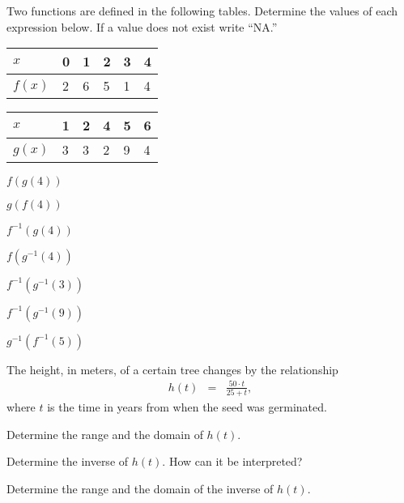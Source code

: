 \begin{problem}
\item Two functions are defined in the following tables. Determine the
  values of each expression below. If a value does not exist write
  ``NA.''

  \begin{tabular}[h]{l||l|l|l|l|l}
    $x$    & 0 & 1 & 2 & 3 & 4 \\ \hline
    $f(x)$ & 2 & 6 & 5 & 1 & 4 \\
  \end{tabular}

  \begin{tabular}[h]{l||l|l|l|l|l}
    $x$    & 1 & 2 & 4 & 5 & 6 \\ \hline
    $g(x)$ & 3 & 3 & 2 & 9 & 4 \\
  \end{tabular}

  \begin{subproblem}
  \item $f(g(4))$
    \vfill
  \item $g(f(4))$
    \vfill
  \item $f^{-1}(g(4))$
    \vfill
  \item $f(g^{-1}(4))$
    \vfill
  \item $f^{-1}(g^{-1}(3))$
    \vfill
  \item $f^{-1}(g^{-1}(9))$
    \vfill
  \item $g^{-1}(f^{-1}(5))$
    \vfill
  \end{subproblem}

  \clearpage

\item The height, in meters, of a certain tree changes by the
  relationship
  \begin{eqnarray*}
    h(t) & = & \frac{50\cdot t}{25+t},
  \end{eqnarray*}
  where $t$ is the time in years from when the seed was germinated.
  \begin{subproblem}
    \item Determine the range and the domain of $h(t)$.
      \vfill
    \item Determine the inverse of $h(t)$. How can it be interpreted?
      \vfill
    \item Determine the range and the domain of the inverse of $h(t)$.
      \vfill
  \end{subproblem}

  \clearpage


\end{problem}
